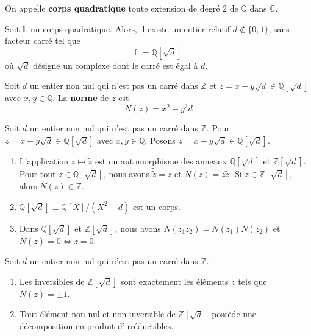   \begin{definition}
    On appelle \textbf{corps quadratique} toute extension de degré $2$ de $\mathbb{Q}$ dans $\mathbb{C}$.
  \end{definition}

  \begin{theorem}
    Soit $\mathbb{L}$ un corps quadratique. Alors, il existe un entier relatif $d \notin \{ 0, 1 \}$, sans facteur carré tel que
    \[ \mathbb{L} = \mathbb{Q}[\sqrt{d}] \]
    où $\sqrt{d}$ désigne un complexe dont le carré est égal à $d$.
  \end{theorem}


  \begin{definition}
    Soit $d$ un entier non nul qui n'est pas un carré dans $\mathbb{Z}$ et $z = x+y\sqrt{d} \in \mathbb{Q}[\sqrt{d}]$ avec $x, y \in \mathbb{Q}$. La \textbf{norme} de $z$ est
    \[ N(z) = x^2-y^2d \]
  \end{definition}

  \begin{proposition}
    Soit $d$ un entier non nul qui n'est pas un carré dans $\mathbb{Z}$. Pour $z = x+y\sqrt{d} \in \mathbb{Q}[\sqrt{d}]$ avec $x,y \in \mathbb{Q}$. Posons $\widetilde{z} = x-y\sqrt{d} \in \mathbb{Q}[\sqrt{d}]$.
    \begin{enumerate}[label={\bfseries(\roman*)}]
      \item L'application $z \mapsto \widetilde{z}$ est un automorphisme des anneaux $\mathbb{Q}[\sqrt{d}]$ et $\mathbb{Z}[\sqrt{d}]$. Pour tout $z \in \mathbb{Q}[\sqrt{d}]$, nous avons $\widetilde{\widetilde{z}} = z$ et $N(z) = z \widetilde{z}$. Si $z \in \mathbb{Z}[\sqrt{d}]$, alors $N(z) \in \mathbb{Z}$.
      \item $\mathbb{Q}[\sqrt{d}] \equiv \mathbb{Q}[X]/(X^2 - d)$ est un corps.
      \item Dans $\mathbb{Q}[\sqrt{d}]$ et $\mathbb{Z}[\sqrt{d}]$, nous avons $N(z_1 z_2) = N(z_1) N(z_2)$ et $N(z) = 0 \iff z = 0$.
    \end{enumerate}
  \end{proposition}

  \begin{proposition}
    Soit $d$ un entier non nul qui n'est pas un carré dans $\mathbb{Z}$.
    \begin{enumerate}[label={\bfseries(\roman*)}]
      \item Les inversibles de $\mathbb{Z}[\sqrt{d}]$ sont exactement les éléments $z$ tels que $N(z) = \pm 1$.
      \item Tout élément non nul et non inversible de $\mathbb{Z}[\sqrt{d}]$ possède une décomposition en produit d'irréductibles.
    \end{enumerate}
  \end{proposition}

